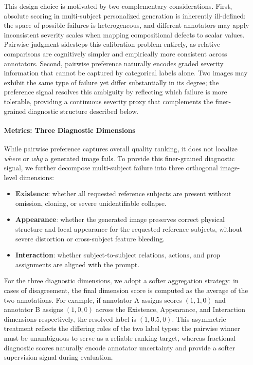 \documentclass{article}
\begin{document}
This design choice is motivated by two complementary considerations. First, absolute scoring in multi-subject personalized generation is inherently ill-defined: the space of possible failures is heterogeneous, and different annotators may apply inconsistent severity scales when mapping compositional defects to scalar values. Pairwise judgment sidesteps this calibration problem entirely, as relative comparisons are cognitively simpler and empirically more consistent across annotators. Second, pairwise preference naturally encodes graded severity information that cannot be captured by categorical labels alone. Two images may exhibit the same type of failure yet differ substantially in its degree; the preference signal resolves this ambiguity by reflecting which failure is more tolerable, providing a continuous severity proxy that complements the finer-grained diagnostic structure described below.

\paragraph{Metrics: Three Diagnostic Dimensions}
While pairwise preference captures overall quality ranking, it does not localize \textit{where} or \textit{why} a generated image fails. To provide this finer-grained diagnostic signal, we further decompose multi-subject failure into three orthogonal image-level dimensions:
\begin{itemize}
    \item \textbf{Existence}: whether all requested reference subjects are present without omission, cloning, or severe unidentifiable collapse.
    \item \textbf{Appearance}: whether the generated image preserves correct physical structure and local appearance for the requested reference subjects, without severe distortion or cross-subject feature bleeding.
    \item \textbf{Interaction}: whether subject-to-subject relations, actions, and prop assignments are aligned with the prompt.
\end{itemize}

For the three diagnostic dimensions, we adopt a softer aggregation strategy: in cases of disagreement, the final dimension score is computed as the average of the two annotations. For example, if annotator A assigns scores $(1, 1, 0)$ and annotator B assigns $(1, 0, 0)$ across the Existence, Appearance, and Interaction dimensions respectively, the resolved label is $(1, 0.5, 0)$. This asymmetric treatment reflects the differing roles of the two label types: the pairwise winner must be unambiguous to serve as a reliable ranking target, whereas fractional diagnostic scores naturally encode annotator uncertainty and provide a softer supervision signal during evaluation.
\end{document}
